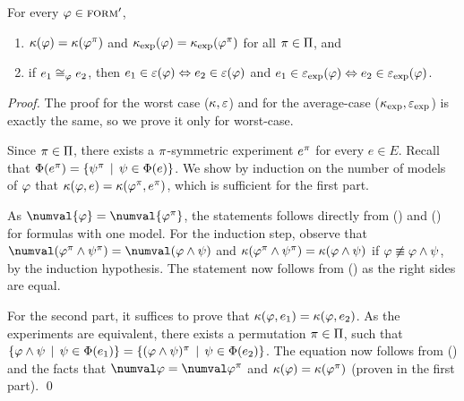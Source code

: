 \begin{theorem}
For every $\varphi\in{\textsc{form}'}$,
\begin{enumerate}
\item $\kappa(\varphi) = \kappa(\varphi^\pi)$ and $\kappa_\textrm{exp}(\varphi) = \kappa_\textrm{exp}(\varphi^\pi)$ for all $\pi\in\Pi$, and
\item if $e_1\cong_{\varphi} e_2$, then $e_1\in\varepsilon(\varphi) \Leftrightarrow e_2\in\varepsilon(\varphi)$ and
  $e_1\in\varepsilon_\textrm{exp}(\varphi) \Leftrightarrow e_2\in\varepsilon_\textrm{exp}(\varphi)$.
\end{enumerate}
\end{theorem}

\begin{proof}
The proof for the worst case ($\kappa, \varepsilon$)
  and for the average-case ($\kappa_\textrm{exp}, \varepsilon_\textrm{exp}$) is exactly the same,
  so we prove it only for worst-case.

Since $\pi\in\Pi$, there exists a $\pi$-symmetric experiment $e^\pi$
  for every $e\in E$.
Recall that $\Phi(e^\pi) = \{ \psi^\pi \:\:|\:\: \psi\in\Phi(e)\}$.
We show by induction on the number of models of $\varphi$
  that $\kappa(\varphi, e) = \kappa(\varphi^\pi, e^\pi)$,
  which is sufficient for the first part.

As $\numval{\form} = \numval{\form^\perm}$, the statements follows directly from
  () and () for formulas with one model.
For the induction step, observe that
  $\numval(\form^\perm \wedge \formx^\perm) = \numval(\form\wedge\formx)$
  and
  $\kappa(\varphi^\pi \wedge \psi^\pi) = \kappa(\varphi\wedge\psi)$
  if $\varphi \not\equiv \varphi\wedge\psi$, by the induction hypothesis.
The statement now follows from ()
  as the right sides are equal.

For the second part, it suffices to prove that
  $\kappa(\varphi, e_1) = \kappa(\varphi, e_2)$.
As the experiments are equivalent, there exists a permutation $\pi\in\Pi$,
 such that
 $\{\varphi\wedge\psi \:\:|\:\:\psi\in\Phi(e_1)\} =
 \{(\varphi\wedge\psi)^\pi \:\:|\:\:\psi\in\Phi(e_2)\}$.
The equation now follows from () and the facts that
 $\numval\form=\numval\form^\perm$ and $\kappa(\varphi) = \kappa(\varphi^\pi)$
 (proven in the first part). \qed
\end{proof}



